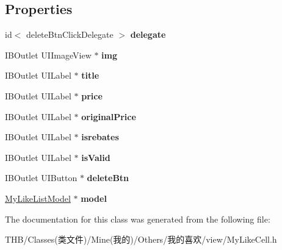 \subsection*{Properties}
\begin{DoxyCompactItemize}
\item 
\mbox{\label{interface_my_like_cell_a2dbfa8acc0464d18ea5e9c9d703025e5}} 
id$<$ delete\+Btn\+Click\+Delegate $>$ {\bfseries delegate}
\item 
\mbox{\label{interface_my_like_cell_a8a5556fffe1b0c10f3f64f47711248b6}} 
I\+B\+Outlet U\+I\+Image\+View $\ast$ {\bfseries img}
\item 
\mbox{\label{interface_my_like_cell_a2f3a204fa69df9215e4f6904c7f30f4c}} 
I\+B\+Outlet U\+I\+Label $\ast$ {\bfseries title}
\item 
\mbox{\label{interface_my_like_cell_a041103599cb594f153487e922051ad1a}} 
I\+B\+Outlet U\+I\+Label $\ast$ {\bfseries price}
\item 
\mbox{\label{interface_my_like_cell_afb7874c4ff83bf9b1756b0ea4d5d401a}} 
I\+B\+Outlet U\+I\+Label $\ast$ {\bfseries original\+Price}
\item 
\mbox{\label{interface_my_like_cell_ae3ef8571dcacdcf52564e9f713912f66}} 
I\+B\+Outlet U\+I\+Label $\ast$ {\bfseries isrebates}
\item 
\mbox{\label{interface_my_like_cell_ace499ec1b0d4b4b097f99c31f16f8ec7}} 
I\+B\+Outlet U\+I\+Label $\ast$ {\bfseries is\+Valid}
\item 
\mbox{\label{interface_my_like_cell_ac625996d08da7c45c715d02463fa91aa}} 
I\+B\+Outlet U\+I\+Button $\ast$ {\bfseries delete\+Btn}
\item 
\mbox{\label{interface_my_like_cell_ad01a61b5ada6a7fe6f004d330363bbd1}} 
\mbox{\hyperlink{interface_my_like_list_model}{My\+Like\+List\+Model}} $\ast$ {\bfseries model}
\end{DoxyCompactItemize}


The documentation for this class was generated from the following file\+:\begin{DoxyCompactItemize}
\item 
T\+H\+B/\+Classes(类文件)/\+Mine(我的)/\+Others/我的喜欢/view/My\+Like\+Cell.\+h\end{DoxyCompactItemize}
